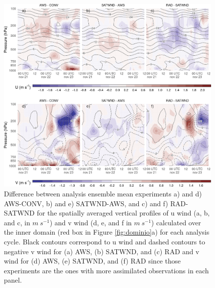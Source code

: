 \documentclass[final,5p,times,twocolumn,authoryear]{elsarticle} %
\begin{document}
\begin{figure}[ht]

{\centering \includegraphics{../figures/UV-diff-1} 

}

\caption{Difference between analysis ensemble mean experiments a) and d) AWS-CONV, b) and e) SATWND-AWS, and c) and f) RAD-SATWND for the spatially averaged vertical profiles of u wind (a, b, and c, in \(m\ s^{-1}\)) and v wind (d, e, and f in \(m\ s^{-1}\)) calculated over the inner domain (red box in Figure \ref{fig:dominio}a) for each analysis cycle. Black contours correspond to u wind and dashed contours to negative v wind for (a) AWS, (b) SATWND, and (c) RAD and v wind for (d) AWS, (e) SATWND, and (f) RAD since those experiments are the ones with more assimilated observations in each panel.}\label{fig:UV-diff}
\end{figure}
\end{document}
